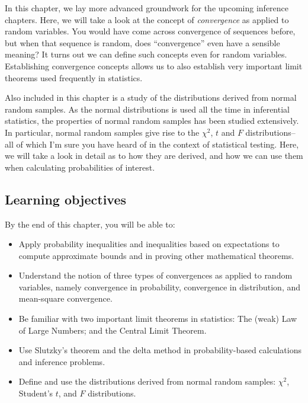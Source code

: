 \documentclass[
]{book}
\providecommand{\tightlist}{%
  \setlength{\itemsep}{0pt}\setlength{\parskip}{0pt}}
\theoremstyle{definition}
\theoremstyle{definition}
\theoremstyle{definition}
\theoremstyle{definition}
\theoremstyle{remark}
\begin{document}
In this chapter, we lay more advanced groundwork for the upcoming inference chapters.
Here, we will take a look at the concept of \emph{convergence} as applied to random variables.
You would have come across convergence of sequences before, but when that sequence is random, does ``convergence'' even have a sensible meaning?
It turns out we can define such concepts even for random variables.
Establishing convergence concepts allows us to also establish very important limit theorems used frequently in statistics.

Also included in this chapter is a study of the distributions derived from normal random samples.
As the normal distributions is used all the time in inferential statistics, the properties of normal random samples has been studied extensively.
In particular, normal random samples give rise to the \(\chi^2\), \(t\) and \(F\) distributions--all of which I'm sure you have heard of in the context of statistical testing.
Here, we will take a look in detail as to how they are derived, and how we can use them when calculating probabilities of interest.

\hypertarget{learning-objectives-2}{%
\subsection*{Learning objectives}\label{learning-objectives-2}}

By the end of this chapter, you will be able to:

\begin{itemize}
\tightlist
\item
  Apply probability inequalities and inequalities based on expectations to compute approximate bounds and in proving other mathematical theorems.
\item
  Understand the notion of three types of convergences as applied to random variables, namely convergence in probability, convergence in distribution, and mean-square convergence.
\item
  Be familiar with two important limit theorems in statistics: The (weak) Law of Large Numbers; and the Central Limit Theorem.
\item
  Use Slutzky's theorem and the delta method in probability-based calculations and inference problems.
\item
  Define and use the distributions derived from normal random samples: \(\chi^2\), Student's \(t\), and \(F\) distributions.
\end{itemize}
\end{document}
